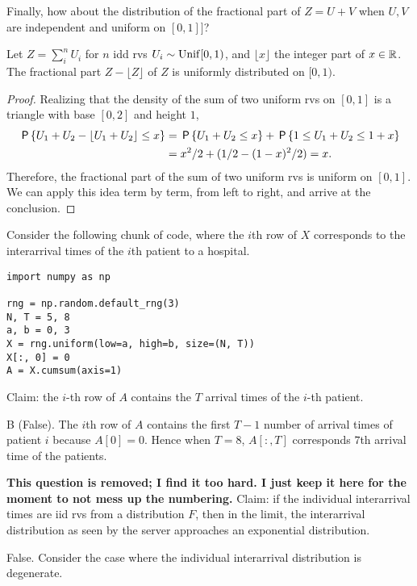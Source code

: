 \documentclass[stochastic-or.tex]{subfiles}
\begin{document}
Finally, how about the distribution of the fractional part of $Z=U+V$ when $U, V$ are independent and uniform on $[0,1]]$?

\begin{theorem}
Let $Z=\sum_{i}^{n} U_{i}$ for $n$ idd rvs $U_{i}\sim \Unif{[0,1)}$, and $\lfloor x \rfloor$  the integer part of $x\in \R$.
The fractional part $Z-\lfloor Z \rfloor$ of $Z$ is uniformly distributed on $[0,1)$.
\end{theorem}
\begin{proof}
Realizing that the density of the sum of two uniform rvs on $[0,1]$ is a triangle with base $[0,2]$ and height $1$,
\begin{align*}
\P{U_{1} +U_{2}- \lfloor U_{1}+U_{2} \rfloor \leq x} &= \P{U_{1} +U_{2}\leq x} + \P{1\leq U_{1} + U_{2}\leq 1 + x} \\
  &= x^{2}/2 +  (1/2 - (1-x)^{2} /2) = x.
\end{align*}
Therefore, the fractional part of the sum of two uniform rvs is uniform on $[0,1]$.
We can apply this idea term by term, from left to right, and arrive at the conclusion.
\end{proof}

\begin{truefalse}
    Consider the following chunk of code, where the $i$th row of $X$ corresponds to the interarrival times of the $i$th patient to a hospital.
    \begin{verbatim}
import numpy as np

rng = np.random.default_rng(3)
N, T = 5, 8
a, b = 0, 3
X = rng.uniform(low=a, high=b, size=(N, T))
X[:, 0] = 0
A = X.cumsum(axis=1)
    \end{verbatim}
Claim: the $i$-th row of $A$ contains the $T$ arrival times of the $i$-th patient.
    \begin{solution}
    B (False).
The $i$th row of $A$ contains the first $T-1$ number of arrival times of patient $i$ because $A[0] = 0$.
Hence when $T=8$, $A[:,T]$ corresponds $7$th arrival time of the patients.
    \end{solution}
\end{truefalse}

\begin{truefalse} \textbf{This question is removed; I find it too hard. I just keep it here for the moment to not mess up the numbering.}
Claim: if the individual interarrival times are iid rvs from a distribution $F$, then in the limit, the interarrival distribution as seen by the server approaches an exponential distribution.
    \begin{solution}
        False. Consider the case where the individual interarrival distribution is degenerate.
    \end{solution}
\end{truefalse}
\end{document}
